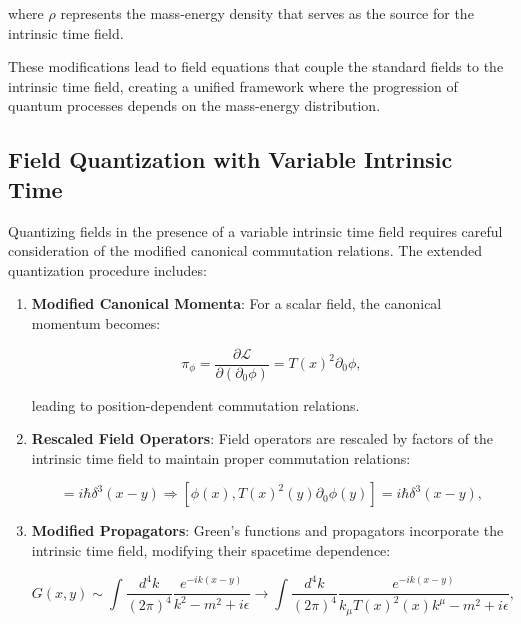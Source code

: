 \documentclass[12pt,a4paper]{article}
\newcommand{\Tfield}{T(x)}
\begin{document}
	where $\rho$ represents the mass-energy density that serves as the source for the intrinsic time field.
	
	These modifications lead to field equations that couple the standard fields to the intrinsic time field, creating a unified framework where the progression of quantum processes depends on the mass-energy distribution.
	
	\subsection{Field Quantization with Variable Intrinsic Time}
	\label{subsec:field_quantization}
	
	Quantizing fields in the presence of a variable intrinsic time field requires careful consideration of the modified canonical commutation relations. The extended quantization procedure includes:
	
	\begin{enumerate}
		\item \textbf{Modified Canonical Momenta}: For a scalar field, the canonical momentum becomes:
		
		\begin{equation}
			\pi_\phi = \frac{\partial \mathcal{L}}{\partial(\partial_0 \phi)} = \Tfield^2 \partial_0 \phi,
			\label{eq:modified_momentum}
		\end{equation}
		
		leading to position-dependent commutation relations.
		
		\item \textbf{Rescaled Field Operators}: Field operators are rescaled by factors of the intrinsic time field to maintain proper commutation relations:
		
		\begin{equation}
			[\phi(x), \pi_\phi(y)] = i\hbar \delta^3(x-y) \Rightarrow [\phi(x), \Tfield^2(y)\partial_0 \phi(y)] = i\hbar \delta^3(x-y),
			\label{eq:rescaled_commutators}
		\end{equation}
		
		\item \textbf{Modified Propagators}: Green's functions and propagators incorporate the intrinsic time field, modifying their spacetime dependence:
		
		\begin{equation}
			G(x,y) \sim \int \frac{d^4k}{(2\pi)^4} \frac{e^{-ik(x-y)}}{k^2 - m^2 + i\epsilon} \rightarrow \int \frac{d^4k}{(2\pi)^4} \frac{e^{-ik(x-y)}}{k_\mu \Tfield^2(x) k^\mu - m^2 + i\epsilon},
			\label{eq:modified_propagator}
		\end{equation}
	\end{enumerate}
	
\end{document}
